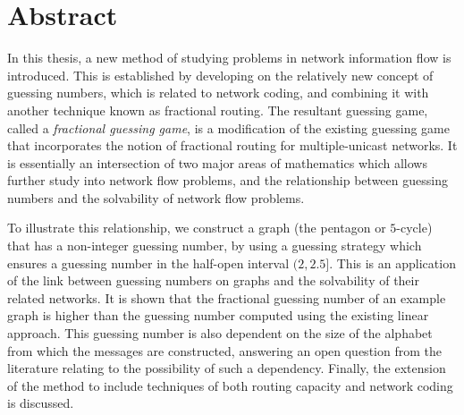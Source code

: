 

\chapter*{Abstract}

In this thesis, a new method of studying problems in network information flow is introduced. This is established by developing on the relatively new concept of guessing numbers, which is related to network coding, and combining it with another technique known as fractional routing. The resultant guessing game, called a \emph{fractional guessing game}, is a modification of the existing guessing game that incorporates the notion of fractional routing for multiple-unicast networks. It is essentially an intersection of two major areas of mathematics which allows further study into network flow problems, and the relationship between guessing numbers and the solvability of network flow problems.

To illustrate this relationship, we construct a graph (the pentagon or $5$-cycle) that has a non-integer guessing number, by using a guessing strategy which ensures a guessing number in the half-open interval $(2, 2.5]$. This is an application of the link between guessing numbers on graphs and the solvability of their related networks. It is shown that the fractional guessing number of an example graph is higher than the guessing number computed using the existing linear approach. This guessing number is also dependent on the size of the alphabet from which the messages are constructed, answering an open question from the literature relating to the possibility of such a dependency. Finally, the extension of the method to include techniques of both routing capacity and network coding is discussed.